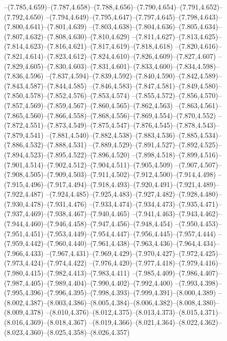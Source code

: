   --(7.785,4.659)--(7.787,4.658)--(7.788,4.656)--(7.790,4.654)--(7.791,4.652)--(7.792,4.650)%
  --(7.794,4.649)--(7.795,4.647)--(7.797,4.645)--(7.798,4.643)--(7.800,4.641)--(7.801,4.639)%
  --(7.803,4.638)--(7.804,4.636)--(7.805,4.634)--(7.807,4.632)--(7.808,4.630)--(7.810,4.629)%
  --(7.811,4.627)--(7.813,4.625)--(7.814,4.623)--(7.816,4.621)--(7.817,4.619)--(7.818,4.618)%
  --(7.820,4.616)--(7.821,4.614)--(7.823,4.612)--(7.824,4.610)--(7.826,4.609)--(7.827,4.607)%
  --(7.829,4.605)--(7.830,4.603)--(7.831,4.601)--(7.833,4.600)--(7.834,4.598)--(7.836,4.596)%
  --(7.837,4.594)--(7.839,4.592)--(7.840,4.590)--(7.842,4.589)--(7.843,4.587)--(7.844,4.585)%
  --(7.846,4.583)--(7.847,4.581)--(7.849,4.580)--(7.850,4.578)--(7.852,4.576)--(7.853,4.574)%
  --(7.855,4.572)--(7.856,4.570)--(7.857,4.569)--(7.859,4.567)--(7.860,4.565)--(7.862,4.563)%
  --(7.863,4.561)--(7.865,4.560)--(7.866,4.558)--(7.868,4.556)--(7.869,4.554)--(7.870,4.552)%
  --(7.872,4.551)--(7.873,4.549)--(7.875,4.547)--(7.876,4.545)--(7.878,4.543)--(7.879,4.541)%
  --(7.881,4.540)--(7.882,4.538)--(7.883,4.536)--(7.885,4.534)--(7.886,4.532)--(7.888,4.531)%
  --(7.889,4.529)--(7.891,4.527)--(7.892,4.525)--(7.894,4.523)--(7.895,4.522)--(7.896,4.520)%
  --(7.898,4.518)--(7.899,4.516)--(7.901,4.514)--(7.902,4.512)--(7.904,4.511)--(7.905,4.509)%
  --(7.907,4.507)--(7.908,4.505)--(7.909,4.503)--(7.911,4.502)--(7.912,4.500)--(7.914,4.498)%
  --(7.915,4.496)--(7.917,4.494)--(7.918,4.493)--(7.920,4.491)--(7.921,4.489)--(7.922,4.487)%
  --(7.924,4.485)--(7.925,4.483)--(7.927,4.482)--(7.928,4.480)--(7.930,4.478)--(7.931,4.476)%
  --(7.933,4.474)--(7.934,4.473)--(7.935,4.471)--(7.937,4.469)--(7.938,4.467)--(7.940,4.465)%
  --(7.941,4.463)--(7.943,4.462)--(7.944,4.460)--(7.946,4.458)--(7.947,4.456)--(7.948,4.454)%
  --(7.950,4.453)--(7.951,4.451)--(7.953,4.449)--(7.954,4.447)--(7.956,4.445)--(7.957,4.444)%
  --(7.959,4.442)--(7.960,4.440)--(7.961,4.438)--(7.963,4.436)--(7.964,4.434)--(7.966,4.433)%
  --(7.967,4.431)--(7.969,4.429)--(7.970,4.427)--(7.972,4.425)--(7.973,4.424)--(7.974,4.422)%
  --(7.976,4.420)--(7.977,4.418)--(7.979,4.416)--(7.980,4.415)--(7.982,4.413)--(7.983,4.411)%
  --(7.985,4.409)--(7.986,4.407)--(7.987,4.405)--(7.989,4.404)--(7.990,4.402)--(7.992,4.400)%
  --(7.993,4.398)--(7.995,4.396)--(7.996,4.395)--(7.998,4.393)--(7.999,4.391)--(8.000,4.389)%
  --(8.002,4.387)--(8.003,4.386)--(8.005,4.384)--(8.006,4.382)--(8.008,4.380)--(8.009,4.378)%
  --(8.010,4.376)--(8.012,4.375)--(8.013,4.373)--(8.015,4.371)--(8.016,4.369)--(8.018,4.367)%
  --(8.019,4.366)--(8.021,4.364)--(8.022,4.362)--(8.023,4.360)--(8.025,4.358)--(8.026,4.357)%
